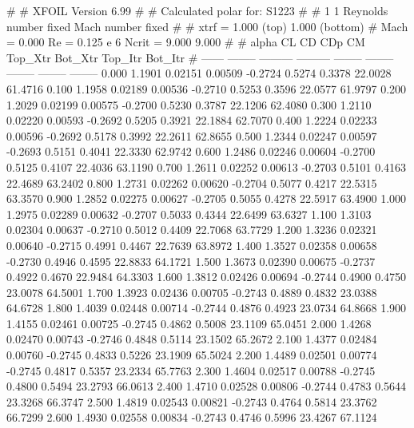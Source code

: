 #  
#       XFOIL         Version 6.99
#  
# Calculated polar for: S1223                                           
#  
# 1 1 Reynolds number fixed          Mach number fixed         
#  
# xtrf =   1.000 (top)        1.000 (bottom)  
# Mach =   0.000     Re =     0.125 e 6     Ncrit =   9.000  9.000
#  
#   alpha    CL        CD       CDp       CM     Top_Xtr  Bot_Xtr  Top_Itr  Bot_Itr
#  ------ -------- --------- --------- -------- -------- -------- -------- --------
   0.000   1.1901   0.02151   0.00509  -0.2724   0.5274   0.3378  22.0028  61.4716
   0.100   1.1958   0.02189   0.00536  -0.2710   0.5253   0.3596  22.0577  61.9797
   0.200   1.2029   0.02199   0.00575  -0.2700   0.5230   0.3787  22.1206  62.4080
   0.300   1.2110   0.02220   0.00593  -0.2692   0.5205   0.3921  22.1884  62.7070
   0.400   1.2224   0.02233   0.00596  -0.2692   0.5178   0.3992  22.2611  62.8655
   0.500   1.2344   0.02247   0.00597  -0.2693   0.5151   0.4041  22.3330  62.9742
   0.600   1.2486   0.02246   0.00604  -0.2700   0.5125   0.4107  22.4036  63.1190
   0.700   1.2611   0.02252   0.00613  -0.2703   0.5101   0.4163  22.4689  63.2402
   0.800   1.2731   0.02262   0.00620  -0.2704   0.5077   0.4217  22.5315  63.3570
   0.900   1.2852   0.02275   0.00627  -0.2705   0.5055   0.4278  22.5917  63.4900
   1.000   1.2975   0.02289   0.00632  -0.2707   0.5033   0.4344  22.6499  63.6327
   1.100   1.3103   0.02304   0.00637  -0.2710   0.5012   0.4409  22.7068  63.7729
   1.200   1.3236   0.02321   0.00640  -0.2715   0.4991   0.4467  22.7639  63.8972
   1.400   1.3527   0.02358   0.00658  -0.2730   0.4946   0.4595  22.8833  64.1721
   1.500   1.3673   0.02390   0.00675  -0.2737   0.4922   0.4670  22.9484  64.3303
   1.600   1.3812   0.02426   0.00694  -0.2744   0.4900   0.4750  23.0078  64.5001
   1.700   1.3923   0.02436   0.00705  -0.2743   0.4889   0.4832  23.0388  64.6728
   1.800   1.4039   0.02448   0.00714  -0.2744   0.4876   0.4923  23.0734  64.8668
   1.900   1.4155   0.02461   0.00725  -0.2745   0.4862   0.5008  23.1109  65.0451
   2.000   1.4268   0.02470   0.00743  -0.2746   0.4848   0.5114  23.1502  65.2672
   2.100   1.4377   0.02484   0.00760  -0.2745   0.4833   0.5226  23.1909  65.5024
   2.200   1.4489   0.02501   0.00774  -0.2745   0.4817   0.5357  23.2334  65.7763
   2.300   1.4604   0.02517   0.00788  -0.2745   0.4800   0.5494  23.2793  66.0613
   2.400   1.4710   0.02528   0.00806  -0.2744   0.4783   0.5644  23.3268  66.3747
   2.500   1.4819   0.02543   0.00821  -0.2743   0.4764   0.5814  23.3762  66.7299
   2.600   1.4930   0.02558   0.00834  -0.2743   0.4746   0.5996  23.4267  67.1124
